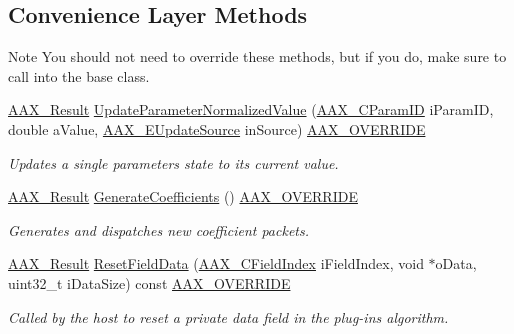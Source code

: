 \subsection*{Convenience Layer Methods}
\label{_amgrpa25aad2c441b64357c88325565684575}%
\begin{DoxyNote}{Note}
You should not need to override these methods, but if you do, make sure to call into the base class. 
\end{DoxyNote}
\begin{DoxyCompactItemize}
\item 
\mbox{\hyperlink{a00392_a4d8f69a697df7f70c3a8e9b8ee130d2f}{A\+A\+X\+\_\+\+Result}} \mbox{\hyperlink{a01969_a9ef4fd6fa467008fcea4455d19c08009}{Update\+Parameter\+Normalized\+Value}} (\mbox{\hyperlink{a00392_a1440c756fe5cb158b78193b2fc1780d1}{A\+A\+X\+\_\+\+C\+Param\+ID}} i\+Param\+ID, double a\+Value, \mbox{\hyperlink{a00491_a30be0398faf20c6b121239eb9399f3f7}{A\+A\+X\+\_\+\+E\+Update\+Source}} in\+Source) \mbox{\hyperlink{a00392_ac2f24a5172689ae684344abdcce55463}{A\+A\+X\+\_\+\+O\+V\+E\+R\+R\+I\+DE}}
\begin{DoxyCompactList}\small\item\em Updates a single parameter\textquotesingle{}s state to its current value. \end{DoxyCompactList}\item 
\mbox{\hyperlink{a00392_a4d8f69a697df7f70c3a8e9b8ee130d2f}{A\+A\+X\+\_\+\+Result}} \mbox{\hyperlink{a01969_a626cb2aaa68c64238298acfd6db448f5}{Generate\+Coefficients}} () \mbox{\hyperlink{a00392_ac2f24a5172689ae684344abdcce55463}{A\+A\+X\+\_\+\+O\+V\+E\+R\+R\+I\+DE}}
\begin{DoxyCompactList}\small\item\em Generates and dispatches new coefficient packets. \end{DoxyCompactList}\item 
\mbox{\hyperlink{a00392_a4d8f69a697df7f70c3a8e9b8ee130d2f}{A\+A\+X\+\_\+\+Result}} \mbox{\hyperlink{a01969_a43db72446afba852f68d19d92c2aa05b}{Reset\+Field\+Data}} (\mbox{\hyperlink{a00392_ae807f8986143820cfb5d6da32165c9c7}{A\+A\+X\+\_\+\+C\+Field\+Index}} i\+Field\+Index, void $\ast$o\+Data, uint32\+\_\+t i\+Data\+Size) const \mbox{\hyperlink{a00392_ac2f24a5172689ae684344abdcce55463}{A\+A\+X\+\_\+\+O\+V\+E\+R\+R\+I\+DE}}
\begin{DoxyCompactList}\small\item\em Called by the host to reset a private data field in the plug-\/in\textquotesingle{}s algorithm. \end{DoxyCompactList}\item 

\end{DoxyCompactItemize}

